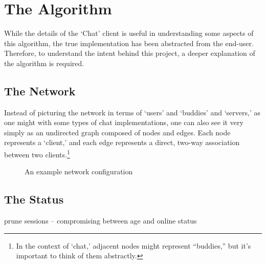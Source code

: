\documentclass[11pt]{article}
\begin{document}
\section{The Algorithm}

While the details of the `Chat' client is useful in understanding some aspects of this algorithm, the true implementation has been abstracted from the end-user. Therefore, to understand the intent behind this project, a deeper explanation of the algorithm is required.

\subsection{The Network}

Instead of picturing the network in terms of `users' and `buddies' and `servers,' as one might with some types of chat implementations, one can also see it very simply as an undirected graph composed of nodes and edges. Each node represents a `client,' and each edge represents a direct, two-way association between two clients.\footnote{In the context of `chat,' adjacent nodes might represent ``buddies,'' but it's important to think of them abstractly.}

\begin{figure}
  \caption{An example network configuration}
  \begin{center}
  \end{center}
\end{figure}


\subsection{The Status}

prune sessions -- compromising between age and online status
\end{document}
